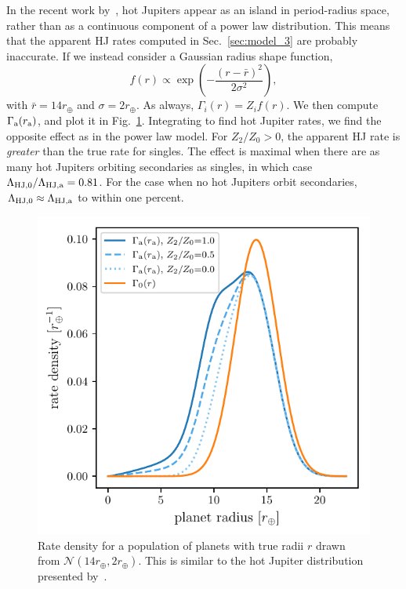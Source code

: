 \documentclass[12pt,modern]{aastex61}
\renewcommand{\a}{_{\rm a}}
\begin{document}
In the recent work by~\citet{petigura_CKS_2017}, hot Jupiters appear as an 
island in period-radius space, rather than as a continuous component of a 
power law distribution.
This means that the apparent HJ rates computed in 
Sec.~\ref{sec:model_3} are probably inaccurate.
If we instead consider a Gaussian radius shape function,
\begin{equation}
f(r) \propto \exp \left( -\frac{(r-\bar{r})^2}{2\sigma^2} \right),
\end{equation}
with $\bar{r} = 14r_\oplus$ and $\sigma = 2r_\oplus$.
As always, $\Gamma_i(r) = Z_i f(r)$.
We then compute $\Gamma\a(r\a)$, and plot it in Fig.~\ref{fig:gaussian_HJ}.
Integrating to find hot Jupiter rates,
we find the opposite effect as in the power law model.
For $Z_2/Z_0>0$, 
the apparent HJ rate is {\it greater} than the true rate for singles.
The effect is maximal when there are as many hot Jupiters orbiting secondaries 
as singles, in which case
$\Lambda_{{\rm HJ},0}/\Lambda_{\rm HJ,a} = 0.81$.
For the case when no hot Jupiters orbit secondaries, $\Lambda_{{\rm HJ},0} 
\approx \Lambda_{\rm HJ,a}$ to within one percent.

\begin{figure}[!tb]
    \centering
    \includegraphics[width=.6\textwidth]{figures/int_rate_density_vs_radius_model_7_rpu_22.5_manyZs.pdf}
    \caption{
        Rate density for a population of planets with true radii $r$ drawn from
        $\mathcal{N}(14r_\oplus,2r_\oplus)$.
        This is similar to the hot Jupiter distribution presented 
        by~\citet{petigura_CKS_2017}.
    }
    \label{fig:gaussian_HJ}
\end{figure}


%
\end{document}

